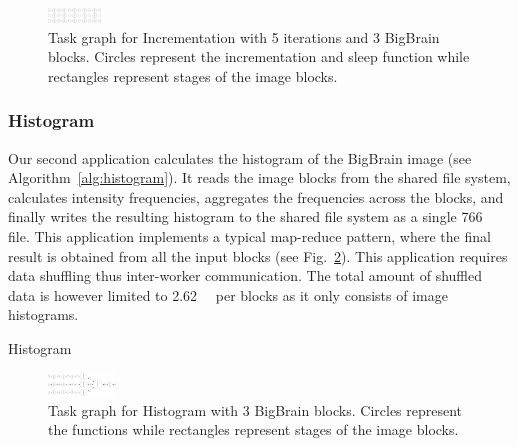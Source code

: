 \documentclass[conference]{IEEEtran}
\begin{document}
\begin{figure}[!b]
    \centering
    \includegraphics[width=0.125\textwidth,
    angle=-90]{images/incrementation-task-graph.png}
    \caption{Task graph for Incrementation with 5 iterations and 3 BigBrain blocks.
    Circles represent the incrementation and sleep function while rectangles
    represent stages of the image blocks.}\label{fig:tg-inc}
\end{figure}

\subsubsection{Histogram}

 Our second application calculates the histogram of the BigBrain image (see
 Algorithm~\ref{alg:histogram}). It reads the image blocks from the shared file
 system, calculates intensity frequencies, aggregates the frequencies across the
 blocks, and finally writes the resulting histogram to the shared file system as a
 single \SI{766}{\kilo\byte} file. This application implements a typical map-reduce
 pattern, where the final result is obtained from all the input blocks (see
 Fig.~\ref{fig:tg-histo}). This application requires data shuffling thus inter-worker
 communication. The total amount of shuffled data is however limited to
 \SI{2.62}{\mega\byte} per blocks as it only consists of image histograms.

\begin{algorithm}[!t]
    \caption{Histogram}\label{alg:histogram}
    \begin{algorithmic}
    \EndFor
    

    \end{algorithmic}
\end{algorithm}

\begin{figure}[!t]
    \centering
    \includegraphics[width=0.16\textwidth, angle=-90]{images/histogram-task-graph.png}
    \caption{Task graph for Histogram with 3 BigBrain blocks. Circles represent the
    functions while rectangles represent stages of the image blocks.
    }\label{fig:tg-histo}
\end{figure}
\end{document}

